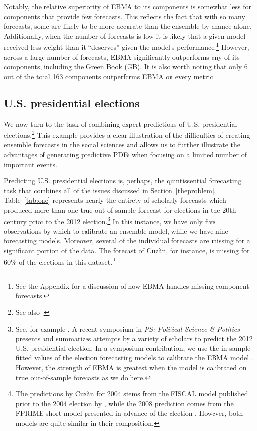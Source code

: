 \documentclass[12pt,fullpage,endnotes]{article}
\begin{document}
Notably, the relative superiority of EBMA to its components is
somewhat less for components that provide few forecasts.  This
reflects the fact that with so many forecasts, some are likely to be
more accurate than the ensemble by chance alone. Additionally, when
the number of forecasts is low it is likely that a given model
received less weight than it ``deserves'' given the model's
performance.\footnote{See the Appendix for a discussion of how EBMA
  handles missing component forecasts.}  However, across a large
  number of forecasts, EBMA significantly outperforms any of its
  components, including the Green Book (GB).  It is also worth noting
  that only 6 out of the total 163 components outperforms EBMA on
  every metric.




\subsection{U.S. presidential elections}

We now turn to the task of combining expert predictions of
U.S. presidential elections.\footnote{See also
  \citep{Montgomery:2012c}.}  This example provides a clear
illustration of the difficulties of creating ensemble forecasts in the
social sciences and allows us to further illustrate the advantages of
generating predictive PDFs when focusing on a limited number of
important events.

Predicting U.S. presidential elections is, perhaps, the quintissential
forecasting task that combines all of the issues discussed in
Section~\ref{theproblem}.  Table~\ref{tab:one} represents nearly the
entirety of scholarly forecasts which produced more than one true
out-of-sample forecast for elections in the 20th century prior to the
2012 election.\footnote{ See, for example \citet[][]{Fair:2009,
    Fair2011, Abramowitz:2008, Campbell:2008,
    Cuzan:2004,Cuzan:Bundrick:2008,hibbs:2012, Lockerbie:2008,
    Erikson:Wlezien:2008, Graefe:2010, Holbrook:2008}.  A recent
  symposium in {\em PS: Political Science \& Politics} presents and
  summarizes attempts by a variety of scholars to predict the 2012
  U.S. presidential election. In a symposium contribution, we use the
  in-sample fitted values of the election forecasting models to
  calibrate the EBMA model \citep{Montgomery:2012c}. However, the
  strength of EBMA is greatest when the model is calibrated on true
  out-of-sample forecasts as we do here.}  In this instance, we have
only five observations by which to calibrate an ensemble model, while
we have nine forecasting models.  Moreover, several of the individual
forecasts are missing for a significant portion of the data.  The
forecast of Cuz\`an, for instance, is missing for 60\% of the
elections in this dataset.\footnote{The predictions by Cuz\`an for
  2004 stems from the FISCAL model published prior to the 2004
  election by \citet{Cuzan:2004}, while the 2008 prediction comes from
  the FPRIME short model presented in advance of the election
  \citep{Cuzan:Bundrick:2008}. However, both models are quite similar
  in their composition.}
\end{document}
